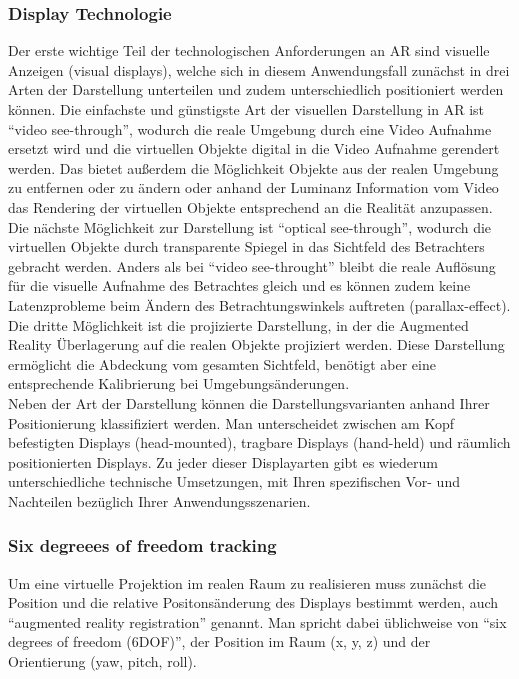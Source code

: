 \subsubsection{Display Technologie}

Der erste wichtige Teil der technologischen Anforderungen an AR sind visuelle Anzeigen (visual displays), welche sich in diesem Anwendungsfall zunächst in drei Arten der Darstellung unterteilen und zudem unterschiedlich positioniert werden können. Die einfachste und günstigste Art der visuellen Darstellung in AR ist “video see-through”, wodurch die reale Umgebung durch eine Video Aufnahme ersetzt wird und die virtuellen Objekte digital in die Video Aufnahme gerendert werden. Das bietet außerdem die Möglichkeit Objekte aus der realen Umgebung zu entfernen oder zu ändern oder anhand der Luminanz Information vom Video das Rendering der virtuellen Objekte entsprechend an die Realität anzupassen. \\

Die nächste Möglichkeit zur Darstellung ist “optical see-through”, wodurch die virtuellen Objekte durch transparente Spiegel in das Sichtfeld des Betrachters gebracht werden. Anders als bei “video see-throught” bleibt die reale Auflösung für die visuelle Aufnahme des Betrachtes gleich und es können zudem keine Latenzprobleme beim Ändern des Betrachtungswinkels auftreten (parallax-effect).\\

Die dritte Möglichkeit ist die projizierte Darstellung, in der die Augmented Reality Überlagerung auf die realen Objekte projiziert werden. Diese Darstellung ermöglicht die Abdeckung vom gesamten Sichtfeld, benötigt aber eine entsprechende Kalibrierung bei Umgebungsänderungen.\\

Neben der Art der Darstellung können die Darstellungsvarianten anhand Ihrer Positionierung klassifiziert werden. Man unterscheidet zwischen am Kopf befestigten Displays (head-mounted), tragbare Displays  (hand-held) und räumlich positionierten Displays. Zu jeder dieser Displayarten gibt es wiederum unterschiedliche technische Umsetzungen, mit Ihren spezifischen Vor- und Nachteilen bezüglich Ihrer Anwendungsszenarien.

\subsubsection{Six degreees of freedom tracking}

Um eine virtuelle Projektion im realen Raum zu realisieren muss zunächst die Position und die relative Positonsänderung des Displays bestimmt werden, auch “augmented reality registration” genannt. Man spricht dabei üblichweise von “six degrees of freedom (6DOF)”, der Position im Raum (x, y, z) und der Orientierung (yaw, pitch, roll). \\

